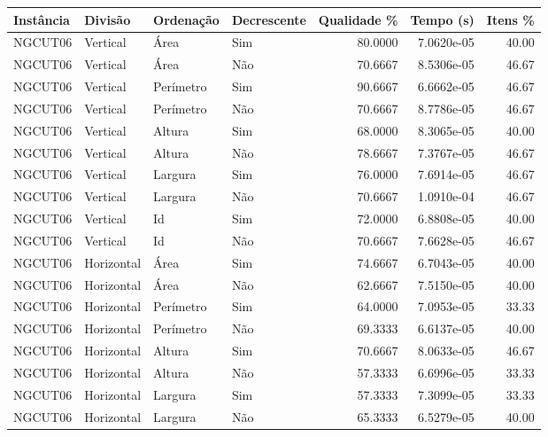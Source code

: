 \begin{tabular}{llllrrr}
    \hline
    Instância & Divisão     & Ordenação & Decrescente & Qualidade \% & Tempo (s)  & Itens \% \\
    \hline
    NGCUT06   & Vertical    & Área      & Sim         & 80.0000      & 7.0620e-05 & 40.00    \\
    NGCUT06   & Vertical    & Área      & Não         & 70.6667      & 8.5306e-05 & 46.67    \\
    NGCUT06   & Vertical    & Perímetro & Sim         & 90.6667      & 6.6662e-05 & 46.67    \\
    NGCUT06   & Vertical    & Perímetro & Não         & 70.6667      & 8.7786e-05 & 46.67    \\
    NGCUT06   & Vertical    & Altura    & Sim         & 68.0000      & 8.3065e-05 & 40.00    \\
    NGCUT06   & Vertical    & Altura    & Não         & 78.6667      & 7.3767e-05 & 46.67    \\
    NGCUT06   & Vertical    & Largura   & Sim         & 76.0000      & 7.6914e-05 & 46.67    \\
    NGCUT06   & Vertical    & Largura   & Não         & 70.6667      & 1.0910e-04 & 46.67    \\
    NGCUT06   & Vertical    & Id        & Sim         & 72.0000      & 6.8808e-05 & 40.00    \\
    NGCUT06   & Vertical    & Id        & Não         & 70.6667      & 7.6628e-05 & 46.67    \\
    NGCUT06   & Horizontal  & Área      & Sim         & 74.6667      & 6.7043e-05 & 40.00    \\
    NGCUT06   & Horizontal  & Área      & Não         & 62.6667      & 7.5150e-05 & 40.00    \\
    NGCUT06   & Horizontal  & Perímetro & Sim         & 64.0000      & 7.0953e-05 & 33.33    \\
    NGCUT06   & Horizontal  & Perímetro & Não         & 69.3333      & 6.6137e-05 & 40.00    \\
    NGCUT06   & Horizontal  & Altura    & Sim         & 70.6667      & 8.0633e-05 & 46.67    \\
    NGCUT06   & Horizontal  & Altura    & Não         & 57.3333      & 6.6996e-05 & 33.33    \\
    NGCUT06   & Horizontal  & Largura   & Sim         & 57.3333      & 7.3099e-05 & 33.33    \\
    NGCUT06   & Horizontal  & Largura   & Não         & 65.3333      & 6.5279e-05 & 40.00    \\

\end{tabular}
